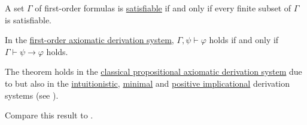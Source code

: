 \smallskip

\begin{corollary}\label{thm:first_order_compactness_theorem}
  A set \( \Gamma \) of first-order formulas is \hyperref[def:propositional_semantics/satisfiability]{satisfiable} if and only if every finite subset of \( \Gamma \) is satisfiable.
\end{corollary}

\begin{theorem}\label{thm:syntactic_deduction_theorem}
  In the \hyperref[def:minimal_propositional_axiomatic_derivation_system]{first-order axiomatic derivation system}, \( \Gamma, \psi \vdash \varphi \) holds if and only if \( \Gamma \vdash \psi \rightarrow \varphi \) holds.

  The theorem holds in the \hyperref[def:propositional_axiomatic_derivation_system]{classical propositional axiomatic derivation system} due to  but also in the \hyperref[def:intuitionistic_propositional_axiomatic_derivation_system]{intuitionistic}, \hyperref[def:intuitionistic_propositional_axiomatic_derivation_system]{minimal} and \hyperref[def:positive_implicational_propositional_derivation_system]{positive implicational} derivation systems (see ).

  Compare this result to .
\end{theorem}

